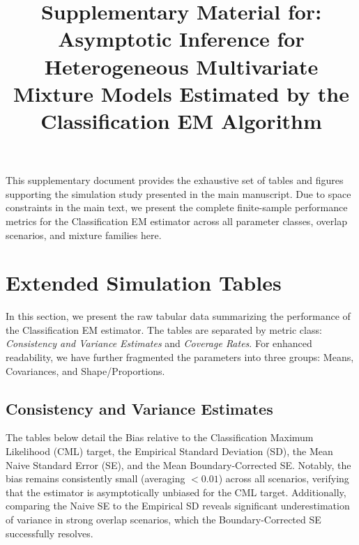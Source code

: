 \documentclass[pdflatex,sn-mathphys-num]{sn-jnl}%
\theoremstyle{thmstyleone}%
\theoremstyle{thmstyletwo}%
\theoremstyle{thmstylethree}%
\begin{document}
\title{Supplementary Material for: Asymptotic Inference for Heterogeneous Multivariate Mixture Models Estimated by the Classification EM Algorithm}
\maketitle

This supplementary document provides the exhaustive set of tables and figures supporting the simulation study presented in the main manuscript. Due to space constraints in the main text, we present the complete finite-sample performance metrics for the Classification EM estimator across all parameter classes, overlap scenarios, and mixture families here.

\section{Extended Simulation Tables}
In this section, we present the raw tabular data summarizing the performance of the Classification EM estimator. The tables are separated by metric class: \textit{Consistency and Variance Estimates} and \textit{Coverage Rates}. For enhanced readability, we have further fragmented the parameters into three groups: Means, Covariances, and Shape/Proportions.

\subsection{Consistency and Variance Estimates}
The tables below detail the Bias relative to the Classification Maximum Likelihood (CML) target, the Empirical Standard Deviation (SD), the Mean Naive Standard Error (SE), and the Mean Boundary-Corrected SE. Notably, the bias remains consistently small (averaging $<0.01$) across all scenarios, verifying that the estimator is asymptotically unbiased for the CML target. Additionally, comparing the Naive SE to the Empirical SD reveals significant underestimation of variance in strong overlap scenarios, which the Boundary-Corrected SE successfully resolves.








\end{document}
